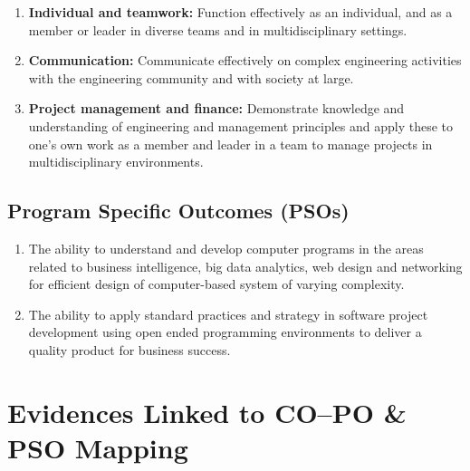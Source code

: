 \documentclass[12pt,a4paper]{report}
\begin{document}
\begin{enumerate}[leftmargin=3em]
\item[\textbf{PO9:}] \textbf{Individual and teamwork:} Function effectively as an individual, and as a member or leader in diverse teams and in multidisciplinary settings.

\item[\textbf{PO10:}] \textbf{Communication:} Communicate effectively on complex engineering activities with the engineering community and with society at large.

\item[\textbf{PO11:}] \textbf{Project management and finance:} Demonstrate knowledge and understanding of engineering and management principles and apply these to one’s own work as a member and leader in a team to manage projects in multidisciplinary environments.

\end{enumerate}


\subsection*{Program Specific Outcomes (PSOs)}

\begin{enumerate}[leftmargin=3.25em]
	\item[\textbf{PSO1:}] 	The ability to understand and develop computer programs in the areas related to business intelligence, big data analytics, web design and networking for efficient design of computer-based system of varying complexity.
	\item[\textbf{PSO2:}] The ability to apply standard practices and strategy in software project development using open ended programming environments to deliver a quality product for business success.


\end{enumerate}


\newpage
\section*{Evidences Linked to CO–PO \& PSO Mapping}



\footnotesize
\end{document}

